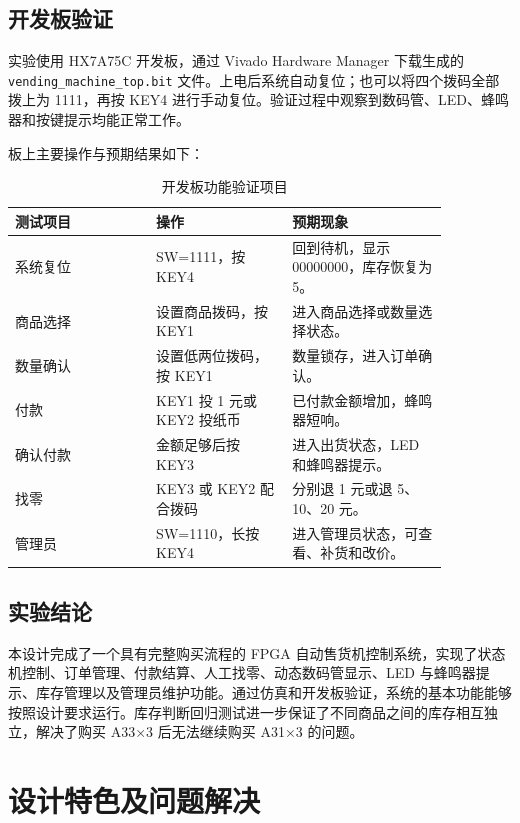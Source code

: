 \documentclass[UTF8,a4paper,12pt]{ctexart}
\begin{document}
\subsection{开发板验证}

实验使用 HX7A75C 开发板，通过 Vivado Hardware Manager 下载生成的 \texttt{vending\_machine\_top.bit} 文件。上电后系统自动复位；也可以将四个拨码全部拨上为 1111，再按 KEY4 进行手动复位。验证过程中观察到数码管、LED、蜂鸣器和按键提示均能正常工作。

板上主要操作与预期结果如下：

\begin{table}[H]
\centering
\caption{开发板功能验证项目}
\label{tab:boardtest}
\begin{tabular}{p{0.28\linewidth}p{0.27\linewidth}p{0.31\linewidth}}
\toprule
测试项目 & 操作 & 预期现象 \\
\midrule
系统复位 & SW=1111，按 KEY4 & 回到待机，显示 00000000，库存恢复为 5。 \\
商品选择 & 设置商品拨码，按 KEY1 & 进入商品选择或数量选择状态。 \\
数量确认 & 设置低两位拨码，按 KEY1 & 数量锁存，进入订单确认。 \\
付款 & KEY1 投 1 元或 KEY2 投纸币 & 已付款金额增加，蜂鸣器短响。 \\
确认付款 & 金额足够后按 KEY3 & 进入出货状态，LED 和蜂鸣器提示。 \\
找零 & KEY3 或 KEY2 配合拨码 & 分别退 1 元或退 5、10、20 元。 \\
管理员 & SW=1110，长按 KEY4 & 进入管理员状态，可查看、补货和改价。 \\
\bottomrule
\end{tabular}
\end{table}

\subsection{实验结论}

本设计完成了一个具有完整购买流程的 FPGA 自动售货机控制系统，实现了状态机控制、订单管理、付款结算、人工找零、动态数码管显示、LED 与蜂鸣器提示、库存管理以及管理员维护功能。通过仿真和开发板验证，系统的基本功能能够按照设计要求运行。库存判断回归测试进一步保证了不同商品之间的库存相互独立，解决了购买 A33×3 后无法继续购买 A31×3 的问题。

\section{设计特色及问题解决}
\end{document}
